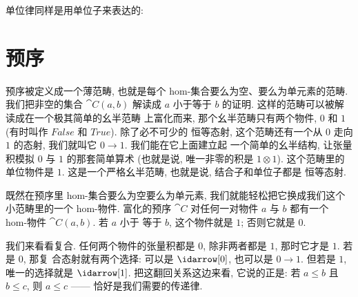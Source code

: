 \noindent
单位律同样是用单位子来表达的:

\begin{figure}[H]
  \centering
  \begin{subfigure}
    \centering
  \end{subfigure}
  \hspace{1cm}
  \begin{subfigure}
    \centering
  \end{subfigure}
\end{figure}

\section{预序}

预序被定义成一个薄范畴, 也就是每个 hom-集合要么为空、要么为单元素的范畴. 我们把非空的集合
$\cat{C}(a, b)$ 解读成 $a$ 小于等于 $b$ 的证明. 这样的范畴可以被解读成在一个极其简单的幺半范畴
上富化而来, 那个幺半范畴只有两个物件, $0$ 和 $1$ (有时叫作 $False$ 和 $True$). 除了必不可少的
恒等态射, 这个范畴还有一个从 $0$ 走向 $1$ 的态射, 我们就叫它 $0 \to 1$. 我们能在它上面建立起
一个简单的幺半结构, 让张量积模拟 $0$ 与 $1$ 的那套简单算术 (也就是说, 唯一非零的积是
$1 \otimes 1$). 这个范畴里的单位物件是 $1$. 这是一个严格幺半范畴, 也就是说, 结合子和单位子都是
恒等态射.

既然在预序里 hom-集合要么为空要么为单元素, 我们就能轻松把它换成我们这个小范畴里的一个 hom-物件.
富化的预序 $\cat{C}$ 对任何一对物件 $a$ 与 $b$ 都有一个 hom-物件 $\cat{C}(a, b)$. 若 $a$ 小于
等于 $b$, 这个物件就是 $1$; 否则它就是 $0$.

我们来看看复合. 任何两个物件的张量积都是 $0$, 除非两者都是 $1$, 那时它才是 $1$. 若是 $0$, 那复
合态射就有两个选择: 可以是 $\idarrow[0]$, 也可以是 $0 \to 1$. 但若是 $1$, 唯一的选择就是
$\idarrow[1]$. 把这翻回关系这边来看, 它说的正是: 若 $a \leqslant b$ 且 $b \leqslant c$, 则
$a \leqslant c$ —— 恰好是我们需要的传递律.

